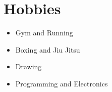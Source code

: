 \documentclass[10pt, letterpaper]{article}
\begin{document}
\section{Hobbies}
    \begin{itemize}
        \item Gym and Running
        \item Boxing and Jiu Jitsu
        \item Drawing
        \item Programming and Electronics
    \end{itemize}
\end{document}

